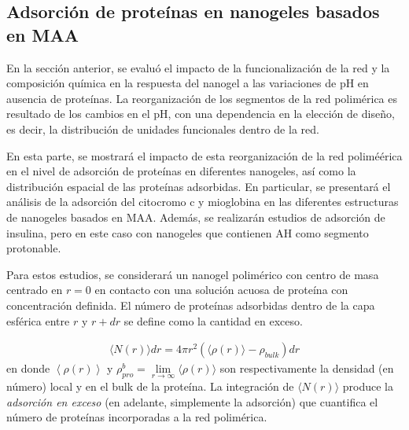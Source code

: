 \subsection{Adsorci\'on de prote\'inas en nanogeles basados en MAA}\label{sec:MAA-NGs}






En la secci\'on anterior, se evalu\'o el impacto de la funcionalizaci\'on de la red y la composici\'on qu\'imica en la respuesta del nanogel a las variaciones de pH en ausencia de prote\'inas. La reorganizaci\'on de los segmentos de la red polim\'erica es resultado de los cambios en el pH, con una dependencia en la elecci\'on de dise\~no, es decir, la distribuci\'on de unidades funcionales dentro de la red.

En esta parte, se mostrar\'a el impacto de esta reorganizaci\'on de la red polimé\'erica en el nivel de adsorci\'on de prote\'inas en diferentes nanogeles, as\'i como la distribuci\'on espacial de las prote\'inas adsorbidas. En particular, se presentar\'a el an\'alisis de la adsorci\'on del citocromo c y mioglobina en las diferentes estructuras de nanogeles basados en MAA. Adem\'as, se realizar\'an estudios de adsorci\'on de insulina, pero en este caso con nanogeles que contienen AH como segmento protonable.%

Para estos estudios, se considerar\'a un nanogel polim\'erico  con centro de masa centrado en $r=0$ en contacto con una soluci\'on acuosa de prote\'ina con concentraci\'on definida. El n\'umero de prote\'inas adsorbidas dentro de la capa esf\'erica entre $r$ y $r+dr$ se define como la cantidad en exceso. 


\begin{align}
     \langle N(r)\rangle dr = 4\pi r^2 \left(\langle\rho(r)\rangle - \rho_{bulk}\right) dr
\end{align}
%
en donde $\left<\rho(r)\right>$ y $\rho^b_{pro}=\lim\limits_{r\to \infty } \langle\rho(r)\rangle$ son respectivamente la densidad (en n\'umero) local y en el bulk de la prote\'ina.
La integraci\'on de $\langle N(r)\rangle$ produce la \emph{adsorci\'on en exceso} (en adelante, simplemente la adsorci\'on) que cuantifica el n\'umero de prote\'inas incorporadas a la red polim\'erica.


